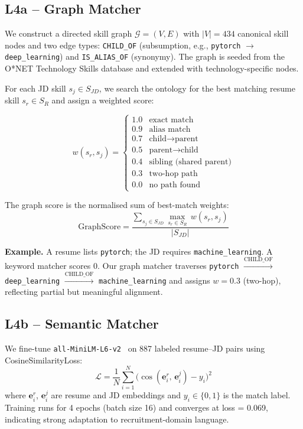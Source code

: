 \documentclass[conference]{IEEEtran}
\begin{document}
\subsection{L4a -- Graph Matcher}
We construct a directed skill graph $\mathcal{G} = (V, E)$ with $|V| = 434$
canonical skill nodes and two edge types: \texttt{CHILD\_OF} (subsumption,
e.g., \texttt{pytorch} $\rightarrow$ \texttt{deep\_learning}) and
\texttt{IS\_ALIAS\_OF} (synonymy). The graph is seeded from the O*NET
Technology Skills database and extended with technology-specific nodes.

For each JD skill $s_j \in S_{JD}$, we search the ontology for the best
matching resume skill $s_r \in S_R$ and assign a weighted score:

\begin{equation}
  w(s_r, s_j) =
  \begin{cases}
    1.0 & \text{exact match} \\
    0.9 & \text{alias match} \\
    0.7 & \text{child} \to \text{parent} \\
    0.5 & \text{parent} \to \text{child} \\
    0.4 & \text{sibling (shared parent)} \\
    0.3 & \text{two-hop path} \\
    0.0 & \text{no path found}
  \end{cases}
\end{equation}

The graph score is the normalised sum of best-match weights:
\begin{equation}
  \text{GraphScore} = \frac{\displaystyle\sum_{s_j \in S_{JD}}
    \max_{s_r \in S_R}\, w(s_r, s_j)}{|S_{JD}|}
\end{equation}

\noindent\textbf{Example.} A resume lists \texttt{pytorch}; the JD requires
\texttt{machine\_learning}. A keyword matcher scores 0. Our graph matcher
traverses \texttt{pytorch} $\xrightarrow{\text{CHILD\_OF}}$
\texttt{deep\_learning} $\xrightarrow{\text{CHILD\_OF}}$
\texttt{machine\_learning} and assigns $w = 0.3$ (two-hop), reflecting
partial but meaningful alignment.

\subsection{L4b -- Semantic Matcher}
We fine-tune \texttt{all-MiniLM-L6-v2}~\cite{reimers2019sbert} on 887
labeled resume--JD pairs using CosineSimilarityLoss:
\begin{equation}
  \mathcal{L} = \frac{1}{N}\sum_{i=1}^{N}
    \bigl(\cos(\mathbf{e}^r_i,\, \mathbf{e}^j_i) - y_i\bigr)^2
\end{equation}
where $\mathbf{e}^r_i$, $\mathbf{e}^j_i$ are resume and JD embeddings and
$y_i \in \{0,1\}$ is the match label. Training runs for 4 epochs
(batch size 16) and converges at loss = 0.069, indicating strong adaptation
to recruitment-domain language.
\end{document}
